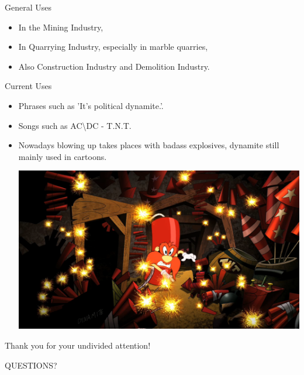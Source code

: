 \documentclass[xcolor=dvipsnames]{beamer}
\begin{document}
\begin{frame}{General Uses}
\begin{itemize}
	\item In the Mining Industry,
	\item In Quarrying Industry, especially in marble quarries,
	\item Also Construction Industry and Demolition Industry.
\end{itemize}
\end{frame}

\begin{frame}{Current Uses}
\begin{itemize}
	\item Phrases such as 'It's political dynamite.'.
    \item Songs such as AC\textbackslash DC - T.N.T.
	\item Nowadays blowing up takes places with badass explosives, dynamite
still mainly used in cartoons.
\begin{center}
\includegraphics[scale=0.2]{./img/cartoon.png}
\end{center}
\end{itemize}
\end{frame}

\begin{frame}
\begin{center}
\LARGE
Thank you for your undivided attention!

\hbox{}

QUESTIONS?
\end{center}
\end{frame}
\end{document}
